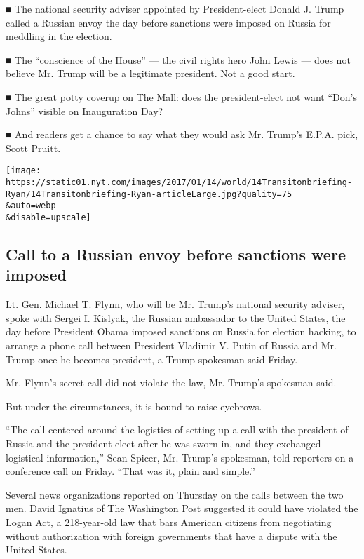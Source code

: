 ■ The national security adviser appointed by President-elect Donald J.
Trump called a Russian envoy the day before sanctions were imposed on
Russia for meddling in the election.

■ The ``conscience of the House'' --- the civil rights hero John Lewis
--- does not believe Mr. Trump will be a legitimate president. Not a
good start.

■ The great potty coverup on The Mall: does the president-elect not want
``Don's Johns'' visible on Inauguration Day?

■ And readers get a chance to say what they would ask Mr. Trump's E.P.A.
pick, Scott Pruitt.

\texttt{[image: https://static01.nyt.com/images/2017/01/14/world/14Transitonbriefing-Ryan/14Transitonbriefing-Ryan-articleLarge.jpg?quality=75\\\&auto=webp\\\&disable=upscale]}

\hypertarget{call-to-a-russian-envoy-before-sanctions-were-imposed}{%
\subsection{Call to a Russian envoy before sanctions were
imposed}\label{call-to-a-russian-envoy-before-sanctions-were-imposed}}

Lt. Gen. Michael T. Flynn, who will be Mr. Trump's national security
adviser, spoke with Sergei I. Kislyak, the Russian ambassador to the
United States, the day before President Obama imposed sanctions on
Russia for election hacking, to arrange a phone call between President
Vladimir V. Putin of Russia and Mr. Trump once he becomes president, a
Trump spokesman said Friday.

Mr. Flynn's secret call did not violate the law, Mr. Trump's spokesman
said.

But under the circumstances, it is bound to raise eyebrows.

``The call centered around the logistics of setting up a call with the
president of Russia and the president-elect after he was sworn in, and
they exchanged logistical information,'' Sean Spicer, Mr. Trump's
spokesman, told reporters on a conference call on Friday. ``That was it,
plain and simple.''

Several news organizations reported on Thursday on the calls between the
two men. David Ignatius of The Washington Post
\href{https://www.washingtonpost.com/opinions/why-did-obama-dawdle-on-russias-hacking/2017/01/12/75f878a0-d90c-11e6-9a36-1d296534b31e_story.html?utm_term=.492828c97762}{suggested}
it could have violated the Logan Act, a 218-year-old law that bars
American citizens from negotiating without authorization with foreign
governments that have a dispute with the United States.

